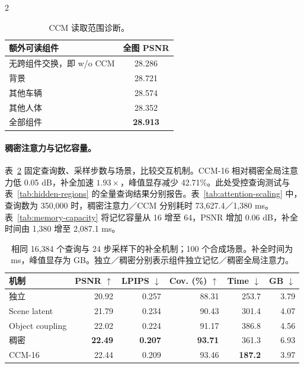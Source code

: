 \begin{multicols}{2}
\begin{table}[H]
\centering\small
\setlength{\tabcolsep}{4pt}
\caption{CCM 读取范围诊断。}
\label{tab:context-read}
\begin{tabular}{@{}lc@{}}
\toprule
额外可读组件 & 全图 PSNR \\
\midrule
无跨组件交换，即 w/o CCM & 28.286 \\
背景 & 28.721 \\
其他车辆 & 28.574 \\
其他人体 & 28.352 \\
全部组件 & \textbf{28.913} \\
\bottomrule
\end{tabular}
\end{table}

\paragraph{稠密注意力与记忆容量。}
表~\ref{tab:dense-attention} 固定查询数、采样步数与场景，比较交互机制。CCM-16 相对稠密全局注意力低 0.05 dB，补全加速 $1.93\times$，峰值显存减少 42.71\%。此处受控查询测试与表~\ref{tab:hidden-regions} 的全量查询结果分别报告。表~\ref{tab:attention-scaling} 中，查询数为 350,000 时，稠密注意力／CCM 分别耗时 73,627.4／1,380 ms。表~\ref{tab:memory-capacity} 将记忆容量从 16 增至 64，PSNR 增加 0.06 dB，补全时间由 1,380 增至 2,087.1 ms。

\begin{table}[H]
\centering\small
\setlength{\tabcolsep}{3pt}
\caption{相同 16,384 个查询与 24 步采样下的补全机制；100 个合成场景。补全时间为 ms，峰值显存为 GB。独立／稠密分别表示组件独立记忆／稠密全局注意力。}
\label{tab:dense-attention}
\begin{tabular}{@{}lrrrrr@{}}
\toprule
机制 & PSNR $\uparrow$ & LPIPS $\downarrow$ & Cov. (\%) $\uparrow$ & Time $\downarrow$ & GB $\downarrow$ \\
\midrule
独立 & 20.92 & 0.257 & 88.31 & 253.7 & 3.79 \\
Scene latent & 21.79 & 0.234 & 90.43 & 301.4 & 4.07 \\
Object coupling & 22.02 & 0.224 & 91.17 & 386.8 & 4.56 \\
稠密 & \textbf{22.49} & \textbf{0.207} & \textbf{93.71} & 361.3 & 6.93 \\
CCM-16 & 22.44 & 0.209 & 93.46 & \textbf{187.2} & 3.97 \\
\bottomrule
\end{tabular}
\end{table}


\end{multicols}
